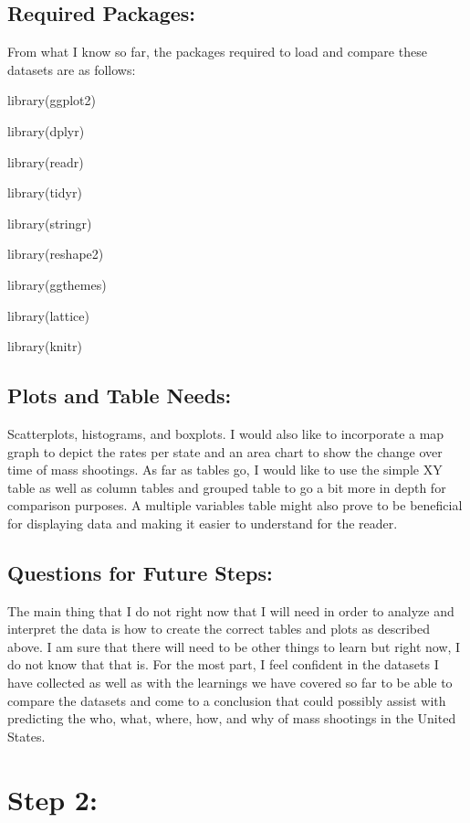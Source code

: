 \documentclass[
]{article}
\begin{document}
\subsection{Required Packages:}\label{required-packages}

From what I know so far, the packages required to load and compare these
datasets are as follows:

library(ggplot2)

library(dplyr)

library(readr)

library(tidyr)

library(stringr)

library(reshape2)

library(ggthemes)

library(lattice)

library(knitr)

\subsection{Plots and Table Needs:}\label{plots-and-table-needs}

Scatterplots, histograms, and boxplots. I would also like to incorporate
a map graph to depict the rates per state and an area chart to show the
change over time of mass shootings. As far as tables go, I would like to
use the simple XY table as well as column tables and grouped table to go
a bit more in depth for comparison purposes. A multiple variables table
might also prove to be beneficial for displaying data and making it
easier to understand for the reader.

\subsection{Questions for Future
Steps:}\label{questions-for-future-steps}

The main thing that I do not right now that I will need in order to
analyze and interpret the data is how to create the correct tables and
plots as described above. I am sure that there will need to be other
things to learn but right now, I do not know that that is. For the most
part, I feel confident in the datasets I have collected as well as with
the learnings we have covered so far to be able to compare the datasets
and come to a conclusion that could possibly assist with predicting the
who, what, where, how, and why of mass shootings in the United States.

\section{Step 2:}\label{step-2}
\end{document}

